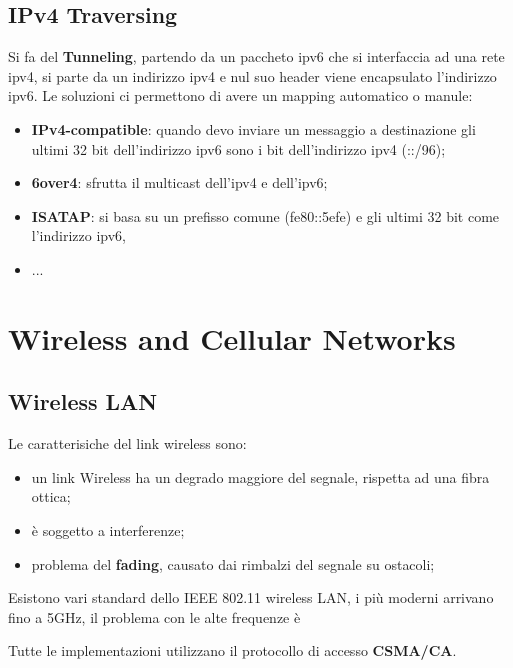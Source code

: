 \documentclass[12pt]{article}
\begin{document}
\subsection{IPv4 Traversing}
Si fa del \textbf{Tunneling}, partendo da un paccheto ipv6 che si interfaccia ad una rete ipv4, si parte da un indirizzo ipv4 e nul suo header viene encapsulato l'indirizzo ipv6. Le soluzioni ci permettono di avere un mapping automatico o manule:
\begin{itemize}
    \item \textbf{IPv4-compatible}: quando devo inviare un messaggio a destinazione gli ultimi 32 bit dell'indirizzo ipv6 sono i bit dell'indirizzo ipv4 (::/96);
    \item \textbf{6over4}: sfrutta il multicast dell'ipv4 e dell'ipv6;
    \item \textbf{ISATAP}: si basa su un prefisso comune (fe80::5efe) e gli ultimi 32 bit come l'indirizzo ipv6,
    \item ...
\end{itemize}




\section{Wireless and Cellular Networks}
\subsection{Wireless LAN}
Le caratterisiche del link wireless sono:
\begin{itemize}
    \item un link Wireless ha un degrado maggiore del segnale, rispetta ad una fibra ottica;
    \item \`e soggetto a interferenze;
    \item problema del \textbf{fading}, causato dai rimbalzi del segnale su ostacoli;
\end{itemize}
Esistono vari standard dello IEEE 802.11 wireless LAN, i pi\`u moderni arrivano fino a 5GHz, il problema con le alte frequenze \`e 

Tutte le implementazioni utilizzano il protocollo di accesso \textbf{CSMA/CA}.
\end{document}
